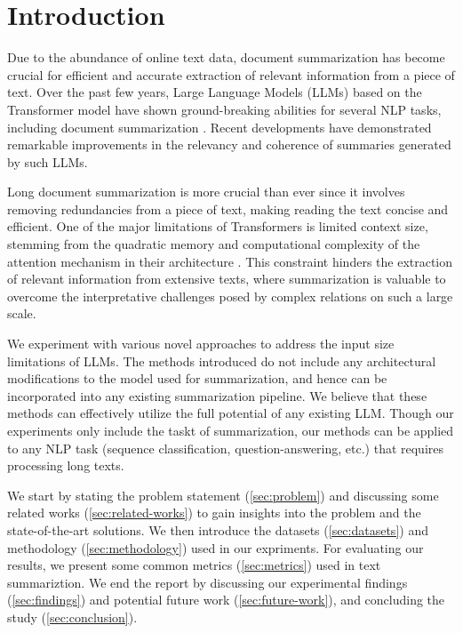 \section{Introduction}
	\label{sec:introduction}

	Due to the abundance of online text data, document summarization has become crucial
	for efficient and accurate extraction of relevant information from a piece of text.
	Over the past few years, Large Language Models (LLMs) based on the Transformer model
	\cite{vaswani2017attention} have shown ground-breaking abilities for several NLP tasks,
	including document summarization \cite{yadav2023state}.
	Recent developments have demonstrated remarkable improvements in the relevancy and
	coherence of summaries generated by such LLMs.

	Long document summarization is more crucial than ever since it involves removing redundancies
	from a piece of text, making reading the text concise and efficient.
	One of the major limitations of Transformers is limited context size, stemming from the
	quadratic memory and computational complexity of the attention mechanism in their architecture
	\cite{du2023improving}.
	This constraint hinders the extraction of relevant information from extensive texts, where
	summarization is valuable to overcome the interpretative challenges posed by complex
	relations on such a large scale.

	We experiment with various novel approaches to address the input size limitations of LLMs.
	The methods introduced do not include any architectural modifications to the model used for
	summarization, and hence can be incorporated into any existing summarization pipeline.
	We believe that these methods can effectively utilize the full potential of any existing LLM.
	Though our experiments only include the taskt of summarization, our methods can be applied
	to any NLP task (sequence classification, question-answering, etc.) that requires processing
	long texts.

	We start by stating the problem statement (\ref{sec:problem}) and discussing some related works
	(\ref{sec:related-works}) to gain insights into the problem and the state-of-the-art solutions.
	We then introduce the datasets (\ref{sec:datasets}) and methodology (\ref{sec:methodology}) used
	in our expriments.
	For evaluating our results, we present some common metrics (\ref{sec:metrics}) used in text
	summariztion.
	We end the report by discussing our experimental findings (\ref{sec:findings}) and potential
	future work (\ref{sec:future-work}), and concluding the study (\ref{sec:conclusion}).
